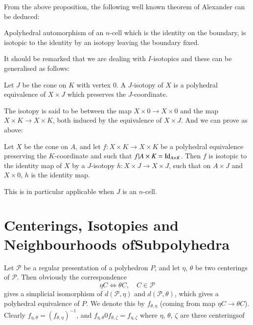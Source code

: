 From the above proposition, the following well known theorem of Alexander can be deduced:

\begin{corollary}\label{chap6-coro6.1.3}
A\pageoriginale polyhedral automorphism of an $n$-cell which is the identity on the boundary, is isotopic to the identity by an isotopy leaving the boundary fixed.
\end{corollary}


It should be remarked that we are dealing with $I$-isotopics and these can be generalised as follows:

\begin{definition}\label{chap6-defi6.1.4}
Let $J$ be the cone on $K$ with vertex $0$. A $J$-isotopy of $X$ is a polyhedral equivalence of $X\times J$ which preserves the $J$-coordinate.
\end{definition}

The isotopy is said to be between the map $X\times 0\to X\times 0$ and the map $X\times K\to X\times K$, both induced by the equivalence of $X\times J$. And we can prove as above:

\begin{proposition}\label{chap6-prop6.1.5}
Let $X$ be the cone on $A$, and let $f:X\times K\to X\times K$ be a polyhedral equivalence preserving the $K$-coordinate and such that $f|A\times K=\operatorname{Id}_{A\times K}$. Then $f$ is isotopic to the identity map of $X$ by a $J$-isotopy $h:X\times J\to X\times J$, such that on $A\times J$ and $X\times 0$, $h$ is the identity map.
\end{proposition}

This is in particular applicable when $J$ is an $n$-cell.

\section[Centerings, Isotopies and Neighbourhoods of...]{Centerings,
  Isotopies and Neighbourhoods of\hfil\break Subpolyhedra}\label{chap6-sec6.2} 

Let $\mathscr{P}$ be a regular presentation of a polyhedron $P$, and let $\eta$, $\theta$ be two centerings of $\mathscr{P}$. Then obviously the correspondence
$$
\eta C\Longleftrightarrow \theta C,\quad C\in \mathscr{P}
$$
gives a simplicial isomorphism of $d(\mathscr{P},\eta)$ and $d(\mathscr{P},\theta)$, which gives a polyhedral equivalence of $P$. We denote this by $f_{\theta,\eta}$ (coming from map $\eta C\to \theta C$). Clearly $f_{\eta,\theta}=(f_{\theta, \eta})^{-1}$, and $f_{\eta,\theta} 0 f_{\theta,\zeta} = f_{\eta, \zeta}$ where $\eta$, $\theta$, $\zeta$ are three centerings\pageoriginale of

